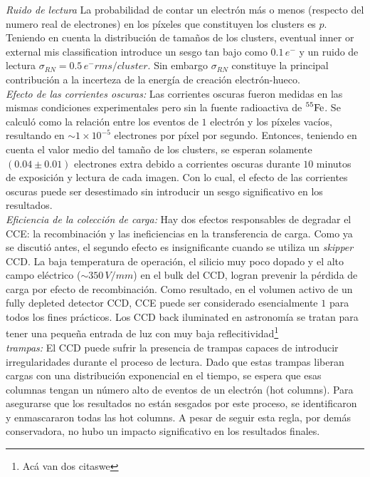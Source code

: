 {\indent \textit{Ruido de lectura} La probabilidad de contar un electrón más o menos (respecto del numero real de electrones) en los píxeles que constituyen los clusters es $p$. Teniendo en cuenta la distribución de tamaños de los clusters, eventual inner or external mis classification introduce un sesgo tan bajo como $0.1\,e^{-}$ y un ruido de lectura $\sigma_{RN} = 0.5\,e^{-}\si{rms/cluster}$. Sin embargo $\sigma_{RN}$ constituye la principal contribución a la incerteza de la energía de creación electrón-hueco.\\
\indent \textit{Efecto de las corrientes oscuras:} Las corrientes oscuras fueron medidas en las mismas condiciones experimentales pero sin la fuente radioactiva de $\prescript{55}{}{\mbox{Fe}}$. Se calculó como la relación entre los eventos de $1$ electrón y los píxeles vacíos, resultando en $\sim 1 \times 10^{-5}$ electrones por píxel por segundo. Entonces, teniendo en cuenta el valor medio del tamaño de los clusters, se esperan solamente $(0.04 \pm 0.01)$ electrones extra debido a corrientes oscuras durante $10$ minutos  de exposición y lectura de cada imagen. Con lo cual, el efecto de las corrientes oscuras puede ser desestimado sin introducir un sesgo significativo en los resultados.\\
\indent \textit{Eficiencia de la colección de carga:} Hay dos efectos responsables de degradar el CCE: la recombinación y las ineficiencias en la transferencia de carga. Como ya se discutió antes, el segundo efecto es insignificante cuando se utiliza un \textit{skipper} CCD. La baja temperatura de operación, el silicio muy poco dopado y el alto campo eléctrico ($\sim350\,\si{V/mm}$) en el bulk del CCD, logran prevenir la pérdida de carga por efecto de recombinación. Como resultado, en el volumen activo de un fully depleted detector CCD, CCE puede ser considerado esencialmente $1$ para todos los fines prácticos. Los CCD back iluminated en astronomía se tratan para tener una pequeña entrada de luz con muy baja reflecitividad\footnote{Acá van dos citaswe}\\
\indent \textit{trampas:} El CCD puede sufrir la presencia de trampas capaces de introducir irregularidades durante el proceso de lectura. Dado que estas trampas liberan cargas con una distribución exponencial en el tiempo, se espera que esas columnas tengan un número alto de eventos de un electrón (hot columns). Para asegurarse que los resultados no están sesgados por este proceso, se identificaron y enmascararon todas las hot columns. A pesar de seguir esta regla, por demás conservadora, no hubo un impacto significativo en los resultados finales.\\
}
